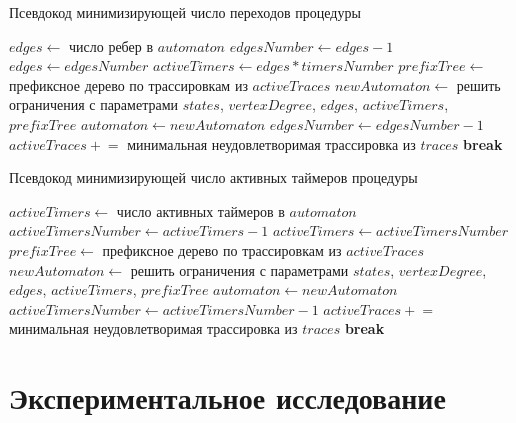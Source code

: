 \documentclass[times,specification,annotation]{itmo-student-thesis}
\begin{document}
\begin{algorithm}[!ht]
\caption{Псевдокод минимизирующей число переходов процедуры}\label{lst2}
\begin{algorithmic}[1]
		\State $edges \gets$ число ребер в $automaton$
		\State $edgesNumber \gets edges - 1$
		\Loop
			\State $edges \gets edgesNumber$
			\State $activeTimers \gets edges * timersNumber$
			\State $prefixTree \gets$ префиксное дерево по трассировкам из $activeTraces$
			\State $newAutomaton \gets$ решить ограничения с параметрами $states$, $vertexDegree$, $edges$, $activeTimers$, $prefixTree$
					\State $automaton \gets newAutomaton$
					\State $edgesNumber \gets edgesNumber - 1$
				\Else
					\State $activeTraces \mathrel{+}=$ минимальная неудовлетворимая трассировка из $traces$
				\EndIf
			\Else
				\State \textbf{break}
			\EndIf
		\EndLoop
	\EndProcedure
\end{algorithmic}
\end{algorithm}

\begin{algorithm}[!ht]
\caption{Псевдокод минимизирующей число активных таймеров процедуры}\label{lst3}
\begin{algorithmic}[1]
		\State $activeTimers \gets$ число активных таймеров в $automaton$
		\State $activeTimersNumber \gets activeTimers - 1$
		\Loop
			\State $activeTimers \gets activeTimersNumber$
			\State $prefixTree \gets$ префиксное дерево по трассировкам из $activeTraces$
			\State $newAutomaton \gets$ решить ограничения с параметрами $states$, $vertexDegree$, $edges$, $activeTimers$, $prefixTree$
					\State $automaton \gets newAutomaton$
					\State $activeTimersNumber \gets activeTimersNumber - 1$
				\Else
					\State $activeTraces \mathrel{+}=$ минимальная неудовлетворимая трассировка из $traces$
				\EndIf
			\Else
				\State \textbf{break}
			\EndIf
		\EndLoop
	\EndProcedure
\end{algorithmic}
\end{algorithm}

\chapter{Экспериментальное исследование}
\end{document}

